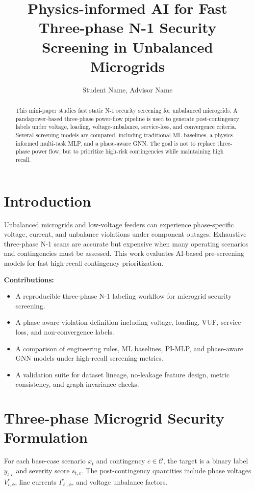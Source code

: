 \documentclass[conference]{IEEEtran}
\title{Physics-informed AI for Fast Three-phase N-1 Security Screening in Unbalanced Microgrids}
\author{Student Name, Advisor Name}
\begin{document}
\maketitle

\begin{abstract}
This mini-paper studies fast static N-1 security screening for unbalanced microgrids. A pandapower-based three-phase power-flow pipeline is used to generate post-contingency labels under voltage, loading, voltage-unbalance, service-loss, and convergence criteria. Several screening models are compared, including traditional ML baselines, a physics-informed multi-task MLP, and a phase-aware GNN. The goal is not to replace three-phase power flow, but to prioritize high-risk contingencies while maintaining high recall.
\end{abstract}

\section{Introduction}
Unbalanced microgrids and low-voltage feeders can experience phase-specific voltage, current, and unbalance violations under component outages. Exhaustive three-phase N-1 scans are accurate but expensive when many operating scenarios and contingencies must be assessed. This work evaluates AI-based pre-screening models for fast high-recall contingency prioritization.

\textbf{Contributions:}
\begin{itemize}
    \item A reproducible three-phase N-1 labeling workflow for microgrid security screening.
    \item A phase-aware violation definition including voltage, loading, VUF, service-loss, and non-convergence labels.
    \item A comparison of engineering rules, ML baselines, PI-MLP, and phase-aware GNN models under high-recall screening metrics.
    \item A validation suite for dataset lineage, no-leakage feature design, metric consistency, and graph invariance checks.
\end{itemize}

\section{Three-phase Microgrid Security Formulation}
For each base-case scenario $x_t$ and contingency $c\in\mathcal{C}$, the target is a binary label $y_{t,c}$ and severity score $s_{t,c}$. The post-contingency quantities include phase voltages $V_{i,\phi}^{c}$, line currents $I_{\ell,\phi}^{c}$, and voltage unbalance factors.
\end{document}
